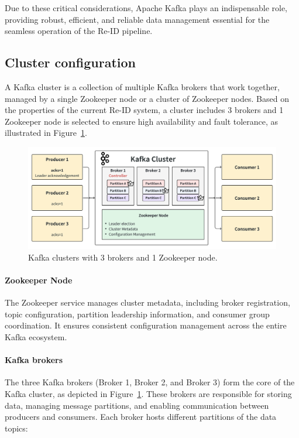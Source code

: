 \documentclass[../main.tex]{subfiles}
\begin{document}
Due to these critical considerations, Apache Kafka plays an indispensable role, providing robust, efficient, and reliable data management essential for the seamless operation of the Re-ID pipeline.

\subsection{Cluster configuration}

A Kafka cluster is a collection of multiple Kafka brokers that work together, managed by a single Zookeeper node or a cluster of Zookeeper nodes. Based on the properties of the current Re-ID system, a cluster includes 3 brokers and 1 Zookeeper node is selected to ensure high availability and fault tolerance, as illustrated in Figure~\ref{fig:kafka_cluster}.

\begin{figure}[htbp]
    \centering
    \includegraphics[width=1\textwidth]{Figure/kafka_overview.png}
    \caption{Kafka clusters with 3 brokers and 1 Zookeeper node.}
    \label{fig:kafka_cluster}
\end{figure}

\paragraph{Zookeeper Node}

The Zookeeper service manages cluster metadata, including broker registration, topic configuration, partition leadership information, and consumer group coordination. It ensures consistent configuration management across the entire Kafka ecosystem.

\paragraph{Kafka brokers}

The three Kafka brokers (Broker 1, Broker 2, and Broker 3) form the core of the Kafka cluster, as depicted in Figure~\ref{fig:kafka_cluster}. These brokers are responsible for storing data, managing message partitions, and enabling communication between producers and consumers. Each broker hosts different partitions of the data topics:
\end{document}
